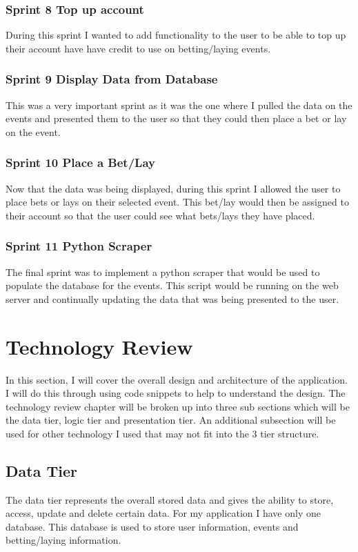 \subsection{Sprint 8 Top up account}
During this sprint I wanted to add functionality to the user to be able to top up their account have have credit to use on betting/laying events.

\subsection{Sprint 9 Display Data from Database}
This was a very important sprint as it was the one where I pulled the data on the events and presented them to the user so that they could then place a bet or lay on the event.

\subsection{Sprint 10 Place a Bet/Lay}
Now that the data was being displayed, during this sprint I allowed the user to place bets or lays on their selected event. This bet/lay would then be assigned to their account so that the user could see what bets/lays they have placed.

\subsection{Sprint 11 Python Scraper}
The final sprint was to implement a python scraper that would be used to populate the database for the events. This script would be running on the web server and continually updating the data that was being presented to the user.

\chapter{Technology Review}
In this section, I will cover the overall design and architecture of the application. I will do this through using code snippets to help to understand the design. The technology review chapter will be broken up into three sub sections which will be the data tier, logic tier and presentation tier. An additional subsection will be used for other technology I used that may not fit into the 3 tier structure.

\section{Data Tier}
The data tier represents the overall stored data and gives the ability to store, access, update and delete certain data. For my application I have only one database. This database is used to store user information, events and betting/laying information.


